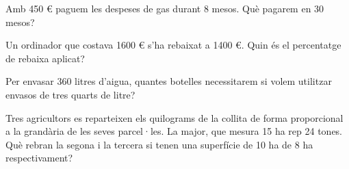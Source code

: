 \begin{autoaval}{46}
\begin{mylist}

\exer[2]  Amb 450 \euro{} paguem les despeses de gas durant 8 mesos.
Què pagarem en 30 mesos?

\answers{1687.5 \euro{}}


\exer[2]  Un ordinador que costava 1600 \euro{} s'ha rebaixat a 1400
\euro{}. Quin és el percentatge de rebaixa aplicat?

\exer[2]  Per envasar 360 litres d'aigua, quantes botelles
necessitarem si volem utilitzar envasos de tres quarts de litre?

\exer[2]  Tres agricultors es reparteixen els quilograms de la collita
de forma proporcional a la grandària de les seves parcel·les. La major,
que mesura 15 ha rep 24 tones. Què rebran la segona  i la tercera si tenen una superfície de  10 ha de 8 ha respectivament?

\end{mylist}
\end{autoaval}
